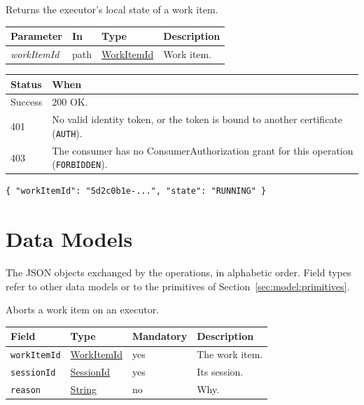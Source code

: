 \documentclass[a4paper]{arrowhead}
\newcommand{\fparam}[1]{\textit{\textcolor{ArrowheadBlue}{#1}}}
\newcommand{\pref}[1]{{\textcolor{ArrowheadGrey}{\hyperref[sec:model:primitives:#1]{#1}}}}
\begin{document}
Returns the executor's local state of a work item.

{\small
\begin{longtable}{|p{3.0cm}|p{1.4cm}|p{3.2cm}|p{8.2cm}|}

\hline
\rowcolor{gray!33} Parameter & In & Type & Description \\ \hline
\endhead
\fparam{workItemId} & path & \pref{WorkItemId} & Work item. \\ \hline
\end{longtable}
}


{\small
\begin{longtable}{|p{2.0cm}|p{13.8cm}|}

\hline
\rowcolor{gray!33} Status & When \\ \hline
\endhead
Success & 200 OK. \\ \hline
401 & No valid identity token, or the token is bound to another certificate (\texttt{AUTH}). \\ \hline
403 & The consumer has no ConsumerAuthorization grant for this operation (\texttt{FORBIDDEN}). \\ \hline
\end{longtable}
}


\begin{lstlisting}[caption={Example response body}]
{ "workItemId": "5d2c0b1e-...", "state": "RUNNING" }
\end{lstlisting}


\newpage
\section{Data Models}
\label{sec:model}
The JSON objects exchanged by the operations, in alphabetic order. Field types refer to other data models or to the
primitives of Section~\ref{sec:model:primitives}.

Aborts a work item on an executor.

{\small
\begin{longtable}{|p{3.7cm}|p{4.2cm}|p{1.6cm}|p{6.3cm}|}

\hline
\rowcolor{gray!33} Field & Type & Mandatory & Description \\ \hline
\endhead
\texttt{workItemId} & \pref{WorkItemId} & yes & The work item. \\ \hline
\texttt{sessionId} & \pref{SessionId} & yes & Its session. \\ \hline
\texttt{reason} & \pref{String} & no & Why. \\ \hline
\end{longtable}
}
\end{document}
